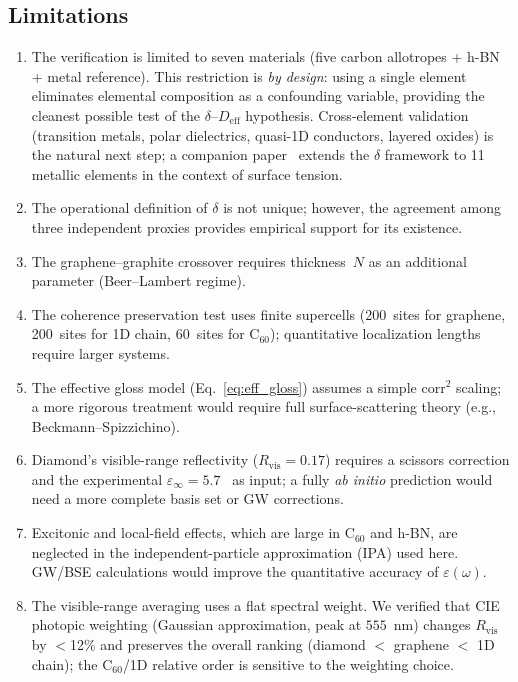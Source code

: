 \documentclass[twocolumn,showpacs,preprintnumbers,amsmath,amssymb,prb]{revtex4-2}
\begin{document}
\subsection{Limitations}

\begin{enumerate}
  \item The verification is limited to seven materials (five carbon
    allotropes + h-BN + metal reference). This restriction is
    \emph{by design}: using a single element eliminates elemental
    composition as a confounding variable, providing the cleanest
    possible test of the $\delta$--$D_\mathrm{eff}$ hypothesis.
    Cross-element validation (transition metals, polar dielectrics,
    quasi-1D conductors, layered oxides) is the natural next step;
    a companion paper~\cite{SentoOpticsPaper2} extends the $\delta$
    framework to 11 metallic elements in the context of surface tension.
  \item The operational definition of $\delta$ is not unique; however,
    the agreement among three independent proxies provides empirical
    support for its existence.
  \item The graphene--graphite crossover requires thickness~$N$ as
    an additional parameter (Beer--Lambert regime).
  \item The coherence preservation test uses finite supercells
    (200~sites for graphene, 200~sites for 1D chain, 60~sites for
    C$_{60}$); quantitative localization lengths require larger systems.
  \item The effective gloss model (Eq.~\ref{eq:eff_gloss}) assumes a
    simple $\mathrm{corr}^2$ scaling; a more rigorous treatment would
    require full surface-scattering theory (e.g., Beckmann--Spizzichino).
  \item Diamond's visible-range reflectivity ($R_\mathrm{vis} = 0.17$)
    requires a scissors correction and the experimental
    $\varepsilon_\infty = 5.7$~\cite{Palik1998} as input; a fully \emph{ab initio} prediction
    would need a more complete basis set or GW corrections.
  \item Excitonic and local-field effects, which are large in C$_{60}$
    and h-BN, are neglected in the independent-particle approximation (IPA)
    used here. GW/BSE calculations would improve the quantitative accuracy
    of $\varepsilon(\omega)$.
  \item The visible-range averaging uses a flat spectral weight. We
    verified that CIE photopic weighting (Gaussian approximation,
    peak at $555$~nm) changes $R_\mathrm{vis}$ by $<$12\% and preserves
    the overall ranking (diamond $<$ graphene $<$ 1D chain); the
    C$_{60}$/1D relative order is sensitive to the weighting choice.
\end{enumerate}
\end{document}
